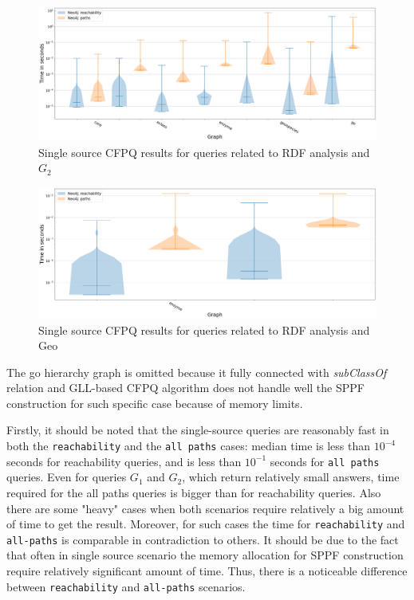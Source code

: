 \begin{figure}[h!]
    \centering
    \includegraphics[width=\textwidth]{figures/ss-g2.png}
    \caption{Single source CFPQ results for queries related to RDF analysis and $G_2$}
    \label{fig:ss-g2}
\end{figure}

\begin{figure}[h!]
    \centering
    \includegraphics[width=\textwidth]{figures/ss-geo.png}
    \caption{Single source CFPQ results for queries related to RDF analysis and Geo}
    \label{fig:ss-geo}
\end{figure}

The go hierarchy graph is omitted because it fully connected with \textit{subClassOf} relation and GLL-based CFPQ algorithm does not handle well the SPPF construction for such specific case because of memory limits.

Firstly, it should be noted that the single-source queries are reasonably fast in both the \texttt{reachability} and the \texttt{all paths} cases: median time is less than $10^{-4}$ seconds for reachability queries, and is less than $10^{-1}$ seconds for \texttt{all paths} queries. Even for queries $G_1$ and $G_2$, which return relatively small answers, time required for the all paths queries is bigger than for reachability queries. Also there are some "heavy" cases when both scenarios require relatively a big amount of time to get the result. Moreover, for such cases the time for \texttt{reachability} and \texttt{all-paths} is comparable in contradiction to others. It should be due to the fact that often in single source scenario the memory allocation for SPPF construction require relatively significant amount of time. Thus, there is a noticeable difference between \texttt{reachability} and \texttt{all-paths} scenarios.

